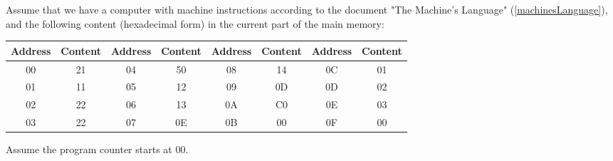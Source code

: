 Assume that we have a computer with machine instructions according to the document "The Machine's Language" (\autoref{machinesLanguage}), and the following content (hexadecimal form) in the current part of the main memory:

\begin{center}
\begin{tabular}{|c|c|c|c|c|c|c|c|}
\hline
\textbf{Address} & \textbf{Content} & \textbf{Address} & \textbf{Content} & \textbf{Address} & \textbf{Content} & \textbf{Address} & \textbf{Content} \\
\hline
00 & 21 & 04 & 50 & 08 & 14 & 0C & 01 \\
01 & 11 & 05 & 12 & 09 & 0D & 0D & 02 \\
02 & 22 & 06 & 13 & 0A & C0 & 0E & 03 \\
03 & 22 & 07 & 0E & 0B & 00 & 0F & 00 \\
\hline
\end{tabular}
\end{center}

Assume the program counter starts at 00.
